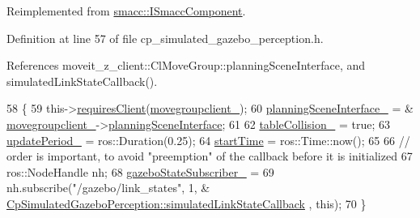 Reimplemented from \hyperlink{classsmacc_1_1ISmaccComponent_ae6f71d008db12553912e9436184b9e65}{smacc\+::\+I\+Smacc\+Component}.



Definition at line 57 of file cp\+\_\+simulated\+\_\+gazebo\+\_\+perception.\+h.



References moveit\+\_\+z\+\_\+client\+::\+Cl\+Move\+Group\+::planning\+Scene\+Interface, and simulated\+Link\+State\+Callback().


\begin{DoxyCode}
58             \{
59                 this->\hyperlink{classsmacc_1_1ISmaccComponent_a36c085d906fbae0fcaee817aaeafebf4}{requiresClient}(\hyperlink{classsm__moveit__4_1_1cl__perception__system_1_1CpSimulatedGazeboPerception_a3c361c94d4a8077d9bfac016a2614056}{movegroupclient\_});
60                 \hyperlink{classsm__moveit__4_1_1cl__perception__system_1_1CpSimulatedGazeboPerception_a34bbc7a8b23a1b1c2d3d4d30bd2fe767}{planningSceneInterface\_} = &
      \hyperlink{classsm__moveit__4_1_1cl__perception__system_1_1CpSimulatedGazeboPerception_a3c361c94d4a8077d9bfac016a2614056}{movegroupclient\_}->\hyperlink{classmoveit__z__client_1_1ClMoveGroup_a21c879b2683286aa21ce68f40195b4b5}{planningSceneInterface};
61                 
62                 \hyperlink{classsm__moveit__4_1_1cl__perception__system_1_1CpSimulatedGazeboPerception_a64beecc85d97c62bc4f884f4601d9c6a}{tableCollision\_} = \textcolor{keyword}{true};
63                 \hyperlink{classsm__moveit__4_1_1cl__perception__system_1_1CpSimulatedGazeboPerception_a185c4065558b0c320d73f366bb6b8277}{updatePeriod\_} = ros::Duration(0.25);
64                 \hyperlink{classsm__moveit__4_1_1cl__perception__system_1_1CpSimulatedGazeboPerception_af27dcb3530d5f2e8919f5e617b46275c}{startTime} = ros::Time::now();
65                 
66                 \textcolor{comment}{// order is important, to avoid "preemption" of the callback before it is initialized}
67                 ros::NodeHandle nh;
68                 \hyperlink{classsm__moveit__4_1_1cl__perception__system_1_1CpSimulatedGazeboPerception_a0808beb5b57079d863a56258279e202f}{gazeboStateSubscriber\_} =
69                     nh.subscribe(\textcolor{stringliteral}{"/gazebo/link\_states"}, 1, &
      \hyperlink{classsm__moveit__4_1_1cl__perception__system_1_1CpSimulatedGazeboPerception_a7914ffd20518c866a8a1e11254589d12}{CpSimulatedGazeboPerception::simulatedLinkStateCallback}
      , \textcolor{keyword}{this});
70             \}
\end{DoxyCode}
